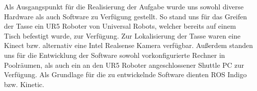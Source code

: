 Als Ausgangspunkt für die Realisierung der Aufgabe wurde uns sowohl diverse Hardware als auch Software zu Verfügung gestellt. So stand uns für das Greifen der Tasse ein UR5 Roboter von Universal Robots, welcher bereits auf einem Tisch befestigt wurde, zur Verfügung. Zur Lokalisierung der Tasse waren eine Kinect bzw. alternativ eine Intel Realsense Kamera verfügbar. Außerdem standen uns für die Entwicklung der Software sowohl vorkonfigurierte Rechner in Poolräumen, als auch ein an den UR5 Roboter angeschlossener Shuttle PC zur Verfügung. Als Grundlage für die zu entwickelnde Software dienten ROS Indigo bzw. Kinetic.